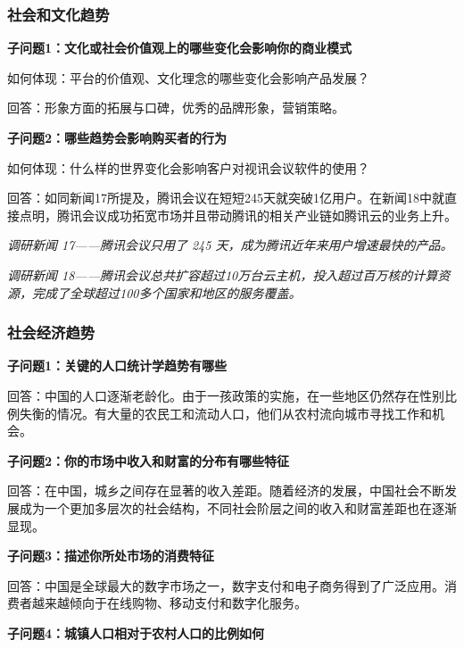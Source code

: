 \documentclass[a4paper,12pt]{article}
\begin{document}
    \subsubsection{社会和文化趋势}    
    \textbf{子问题1：文化或社会价值观上的哪些变化会影响你的商业模式}

    如何体现：平台的价值观、⽂化理念的哪些变化会影响产品发展？

    回答：形象⽅⾯的拓展与⼝碑，优秀的品牌形象，营销策略。

    \textbf{子问题2：哪些趋势会影响购买者的行为}

    如何体现：什么样的世界变化会影响客户对视讯会议软件的使⽤？

    回答：如同新闻17所提及，腾讯会议在短短245天就突破1亿⽤户。在新闻18中就直接点明，腾讯会议成功拓宽市场并且带动腾讯的相关产业链如腾讯云的业务上升。

    \textit{调研新闻 17——腾讯会议只⽤了 245 天，成为腾讯近年来⽤户增速最快的产品。}
    
    \textit{}

    \textit{调研新闻 18——腾讯会议总共扩容超过10万台云主机，投⼊超过百万核的计算资源，完成了全球超过100多个国家和地区的服务覆盖。}
    
    \textit{}
    
    \subsubsection{社会经济趋势}
    \textbf{子问题1：关键的人口统计学趋势有哪些}

    回答：中国的人口逐渐老龄化。由于一孩政策的实施，在一些地区仍然存在性别比例失衡的情况。有大量的农民工和流动人口，他们从农村流向城市寻找工作和机会。

    \textbf{子问题2：你的市场中收入和财富的分布有哪些特征}

    回答：在中国，城乡之间存在显著的收入差距。随着经济的发展，中国社会不断发展成为一个更加多层次的社会结构，不同社会阶层之间的收入和财富差距也在逐渐显现。

    \textbf{子问题3：描述你所处市场的消费特征}

    回答：中国是全球最大的数字市场之一，数字支付和电子商务得到了广泛应用。消费者越来越倾向于在线购物、移动支付和数字化服务。

    \textbf{子问题4：城镇人口相对于农村人口的比例如何}
\end{document}
